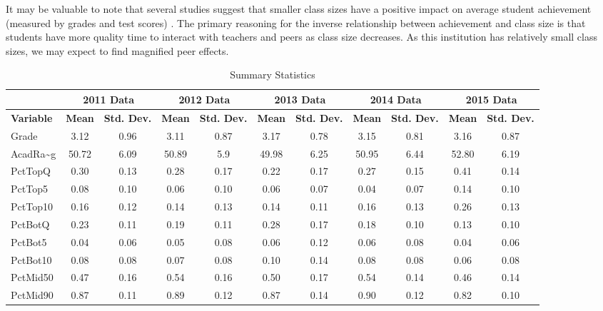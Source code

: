 \documentclass[12pt,a4paper,english,fleqn]{article}
\newcommand{\prbf}[1]{\textbf{#1}}
\begin{document}
It may be valuable to note that several studies suggest that smaller class sizes have a positive impact on average student achievement (measured by grades and test scores) \citep{diette2015class,kokkelenberg2008effects}. 
The primary reasoning for the inverse relationship between achievement and class size is that students have more quality time to interact with teachers and peers as class size decreases. 
As this institution has relatively small class sizes, we may expect to find magnified peer effects. 

\begin{sidewaystable}
\caption{Summary Statistics}\label{tab:summarystats}
\centering\begin{tabular}{|l|c|c|c|c|c|c|c|c|c|c|}
\hline
\hline
& \multicolumn{2}{|c|}{2011 Data} & \multicolumn{2}{|c|}{2012 Data} & \multicolumn{2}{|c|}{2013 Data} & \multicolumn{2}{|c|}{2014 Data}  & \multicolumn{2}{|c|}{2015 Data}\\
\hline
\prbf{Variable} & \prbf{Mean} & \prbf{Std. Dev.} & \prbf{Mean} & \prbf{Std. Dev.} & \prbf{Mean} & \prbf{Std. Dev.}  & \prbf{Mean} & \prbf{Std. Dev.} & \prbf{Mean} & \prbf{Std. Dev.}\\
\hline
            Grade    & 3.12  & 0.96 & 3.11  & 0.87 & 3.17  & 0.78 & 3.15  & 0.81 & 3.16  & 0.87 \\
            AcadRa{\textasciitilde}g & 50.72 & 6.09 & 50.89 & 5.9  & 49.98 & 6.25 & 50.95 & 6.44 & 52.80 & 6.19 \\
            PctTopQ  & 0.30  & 0.13 & 0.28  & 0.17 & 0.22  & 0.17 & 0.27  & 0.15 & 0.41  & 0.14 \\
            PctTop5  & 0.08  & 0.10 & 0.06  & 0.10 & 0.06  & 0.07 & 0.04  & 0.07 & 0.14  & 0.10 \\
            PctTop10 & 0.16  & 0.12 & 0.14  & 0.13 & 0.14  & 0.11 & 0.16  & 0.13 & 0.26  & 0.13 \\
            PctBotQ  & 0.23  & 0.11 & 0.19  & 0.11 & 0.28  & 0.17 & 0.18  & 0.10 & 0.13  & 0.10 \\
            PctBot5  & 0.04  & 0.06 & 0.05  & 0.08 & 0.06  & 0.12 & 0.06  & 0.08 & 0.04  & 0.06 \\
            PctBot10 & 0.08  & 0.08 & 0.07  & 0.08 & 0.10  & 0.14 & 0.08  & 0.08 & 0.06  & 0.08 \\
            PctMid50 & 0.47  & 0.16 & 0.54  & 0.16 & 0.50  & 0.17 & 0.54  & 0.14 & 0.46  & 0.14 \\
            PctMid90 & 0.87  & 0.11 & 0.89  & 0.12 & 0.87  & 0.14 & 0.90  & 0.12 & 0.82  & 0.10 \\

\end{tabular}
\end{sidewaystable}
\end{document}
